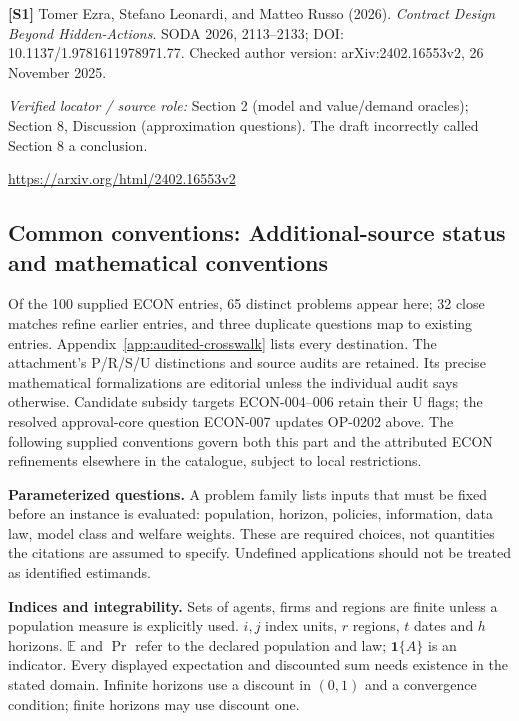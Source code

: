 \documentclass[11pt,a4paper]{article}
\begin{document}
{\footnotesize\raggedright
\par\noindent\textbf{[S1]} Tomer Ezra, Stefano Leonardi, and Matteo Russo (2026). \emph{Contract Design Beyond Hidden-Actions}. SODA 2026, 2113--2133; DOI: 10.1137/1.9781611978971.77. Checked author version: arXiv:2402.16553v2, 26 November 2025.\par \textit{Verified locator / source role:} Section 2 (model and value/demand oracles); Section 8, Discussion (approximation questions). The draft incorrectly called Section 8 a conclusion.\par \url{https://arxiv.org/html/2402.16553v2}\par\smallskip
}

\subsection*{Common conventions: Additional-source status and mathematical conventions}

\label{audited:conventions}

Of the 100 supplied ECON entries, 65 distinct problems appear here; 32 close
matches refine earlier entries, and three duplicate questions map to existing
entries. Appendix~\ref{app:audited-crosswalk} lists every destination.
The attachment's P/R/S/U distinctions and source audits are retained. Its
precise mathematical formalizations are editorial unless the individual audit
says otherwise. Candidate subsidy targets ECON-004--006 retain their U flags;
the resolved approval-core question ECON-007 updates OP-0202 above.
The following supplied conventions govern both this part and the attributed
ECON refinements elsewhere in the catalogue, subject to local restrictions.

\textbf{Parameterized questions.} A problem family lists inputs that must be fixed before an instance is evaluated: population, horizon, policies, information, data law, model class and welfare weights. These are required choices, not quantities the citations are assumed to specify. Undefined applications should not be treated as identified estimands.

\textbf{Indices and integrability.} Sets of agents, firms and regions are finite unless a population measure is explicitly used. \(i,j\) index units, \(r\) regions, \(t\) dates and \(h\) horizons. \(\mathbb E\) and \(\Pr\) refer to the declared population and law; \(\mathbf1\{A\}\) is an indicator. Every displayed expectation and discounted sum needs existence in the stated domain. Infinite horizons use a discount in \((0,1)\) and a convergence condition; finite horizons may use discount one.
\end{document}
